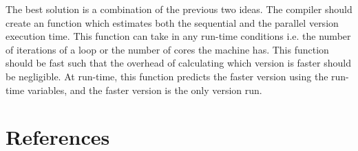 \documentclass[conference]{IEEEtran}
\begin{document}
The best solution is a combination of the previous two ideas. The compiler should create an function which estimates both the sequential and the parallel version execution time. This function can take in any run-time conditions i.e. the number of iterations of a loop or the number of cores the machine has. This function should be fast such that the overhead of calculating which version is faster should be negligible. At run-time, this function predicts the faster version using the run-time variables, and the faster version is the only version run.

\section{References}
\printbibliography[heading=none]
\end{document}
